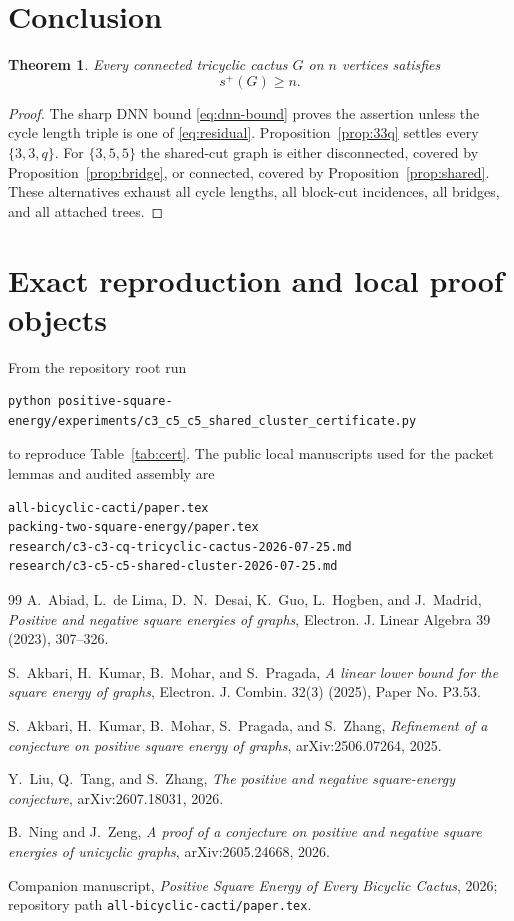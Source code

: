\documentclass[11pt]{article}
\newtheorem{theorem}{Theorem}[section]
\begin{document}
\section{Conclusion}

\begin{theorem}\label{thm:main}
Every connected tricyclic cactus $G$ on $n$ vertices satisfies
\[
 \boxed{s^+(G)\geq n}.
\]
\end{theorem}

\begin{proof}
The sharp DNN bound \eqref{eq:dnn-bound} proves the assertion unless the cycle
length triple is one of \eqref{eq:residual}.  Proposition~\ref{prop:33q}
settles every $\{3,3,q\}$.  For $\{3,5,5\}$ the shared-cut graph is either
disconnected, covered by Proposition~\ref{prop:bridge}, or connected, covered
by Proposition~\ref{prop:shared}.  These alternatives exhaust all cycle
lengths, all block-cut incidences, all bridges, and all attached trees.
\end{proof}

\appendix
\section{Exact reproduction and local proof objects}

From the repository root run
\begin{verbatim}
python positive-square-energy/experiments/c3_c5_c5_shared_cluster_certificate.py
\end{verbatim}
to reproduce Table~\ref{tab:cert}.  The public local manuscripts used for the
packet lemmas and audited assembly are
\begin{verbatim}
all-bicyclic-cacti/paper.tex
packing-two-square-energy/paper.tex
research/c3-c3-cq-tricyclic-cactus-2026-07-25.md
research/c3-c5-c5-shared-cluster-2026-07-25.md
\end{verbatim}

\begin{thebibliography}{99}
A.~Abiad, L.~de Lima, D.~N.~Desai, K.~Guo, L.~Hogben, and J.~Madrid,
\emph{Positive and negative square energies of graphs},
Electron. J. Linear Algebra 39 (2023), 307--326.

S.~Akbari, H.~Kumar, B.~Mohar, and S.~Pragada,
\emph{A linear lower bound for the square energy of graphs},
Electron. J. Combin. 32(3) (2025), Paper No. P3.53.

S.~Akbari, H.~Kumar, B.~Mohar, S.~Pragada, and S.~Zhang,
\emph{Refinement of a conjecture on positive square energy of graphs},
arXiv:2506.07264, 2025.

Y.~Liu, Q.~Tang, and S.~Zhang,
\emph{The positive and negative square-energy conjecture},
arXiv:2607.18031, 2026.

B.~Ning and J.~Zeng,
\emph{A proof of a conjecture on positive and negative square energies of
unicyclic graphs}, arXiv:2605.24668, 2026.

Companion manuscript, \emph{Positive Square Energy of Every Bicyclic Cactus},
2026; repository path \texttt{all-bicyclic-cacti/paper.tex}.
\end{thebibliography}
\end{document}
